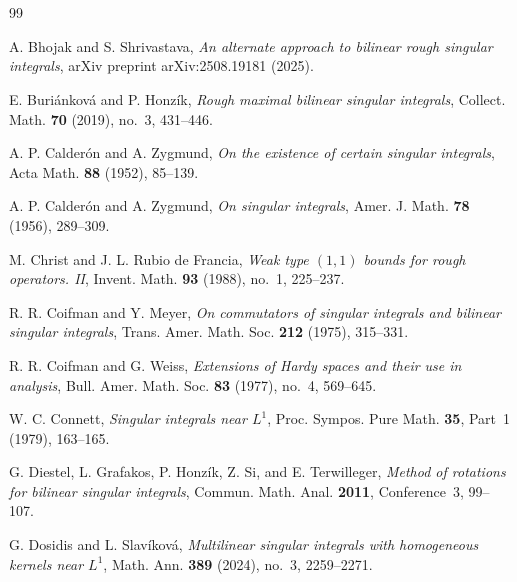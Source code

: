 \documentclass[11pt]{amsart}
\begin{document}
\section*{}
\setlength{\baselineskip}{18pt}


\begin{thebibliography}{99}
	
	A. Bhojak and S. Shrivastava,
	{\it An alternate approach to bilinear rough singular integrals},
	arXiv preprint arXiv:2508.19181 (2025).
	
	E. Buri\'ankov\'a and P. Honz\'ik,
	{\it Rough maximal bilinear singular integrals},
	Collect. Math. \textbf{70} (2019), no.~3, 431--446.
	
	A. P. Calder\'on and A. Zygmund,
	{\it On the existence of certain singular integrals},
	Acta Math. \textbf{88} (1952), 85--139.
	
	A. P. Calder\'on and A. Zygmund,
	{\it On singular integrals},
	Amer. J. Math. \textbf{78} (1956), 289--309.
	
	M. Christ and J. L. Rubio de Francia,
	{\it Weak type $(1,1)$ bounds for rough operators. II},
	Invent. Math. \textbf{93} (1988), no.~1, 225--237.
	
	R. R. Coifman and Y. Meyer,
	{\it On commutators of singular integrals and bilinear singular integrals},
	Trans. Amer. Math. Soc. \textbf{212} (1975), 315--331.
	
	R. R. Coifman and G. Weiss,
	{\it Extensions of Hardy spaces and their use in analysis},
	Bull. Amer. Math. Soc. \textbf{83} (1977), no.~4, 569--645.
	
	W. C. Connett,
	{\it Singular integrals near $L^1$},
	Proc. Sympos. Pure Math. \textbf{35}, Part~1 (1979), 163--165.
	
	G. Diestel, L. Grafakos, P. Honz\'ik, Z. Si, and E. Terwilleger,
	{\it Method of rotations for bilinear singular integrals},
	Commun. Math. Anal. \textbf{2011}, Conference~3, 99--107.
	
	G. Dosidis and L. Slav\'ikov\'a,
	{\it Multilinear singular integrals with homogeneous kernels near $L^1$},
	Math. Ann. \textbf{389} (2024), no.~3, 2259--2271.
	

\end{thebibliography}
\end{document}
